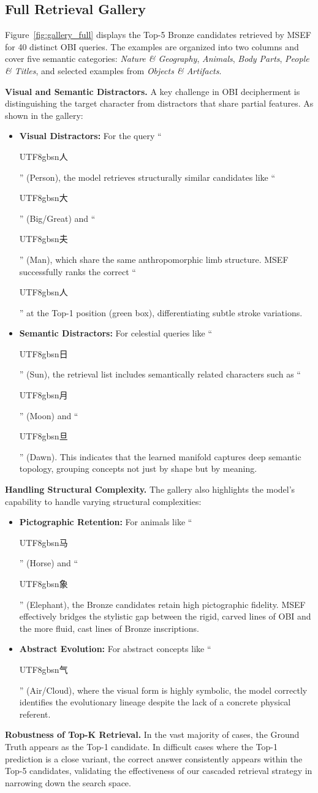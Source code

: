 \documentclass{article}
\newcommand{\cg}[1]{\begin{CJK*}{UTF8}{gbsn}#1\end{CJK*}}
\begin{document}
\subsection{Full Retrieval Gallery}
Figure~\ref{fig:gallery_full} displays the Top-5 Bronze candidates retrieved by MSEF for 40 distinct OBI queries. The examples are organized into two columns and cover five semantic categories: \textit{Nature \& Geography}, \textit{Animals}, \textit{Body Parts}, \textit{People \& Titles}, and selected examples from \textit{Objects \& Artifacts}.

\textbf{Visual and Semantic Distractors.}
A key challenge in OBI decipherment is distinguishing the target character from distractors that share partial features. As shown in the gallery:
\begin{itemize}
    \item \textbf{Visual Distractors:} For the query ``\cg{人}'' (Person), the model retrieves structurally similar candidates like ``\cg{大}'' (Big/Great) and ``\cg{夫}'' (Man), which share the same anthropomorphic limb structure. MSEF successfully ranks the correct ``\cg{人}'' at the Top-1 position (green box), differentiating subtle stroke variations.
    \item \textbf{Semantic Distractors:} For celestial queries like ``\cg{日}'' (Sun), the retrieval list includes semantically related characters such as ``\cg{月}'' (Moon) and ``\cg{旦}'' (Dawn). This indicates that the learned manifold captures deep semantic topology, grouping concepts not just by shape but by meaning.
\end{itemize}

\textbf{Handling Structural Complexity.}
The gallery also highlights the model's capability to handle varying structural complexities:
\begin{itemize}
    \item \textbf{Pictographic Retention:} For animals like ``\cg{马}'' (Horse) and ``\cg{象}'' (Elephant), the Bronze candidates retain high pictographic fidelity. MSEF effectively bridges the stylistic gap between the rigid, carved lines of OBI and the more fluid, cast lines of Bronze inscriptions.
    \item \textbf{Abstract Evolution:} For abstract concepts like ``\cg{气}'' (Air/Cloud), where the visual form is highly symbolic, the model correctly identifies the evolutionary lineage despite the lack of a concrete physical referent.
\end{itemize}

\textbf{Robustness of Top-K Retrieval.}
In the vast majority of cases, the Ground Truth appears as the Top-1 candidate. In difficult cases where the Top-1 prediction is a close variant, the correct answer consistently appears within the Top-5 candidates, validating the effectiveness of our cascaded retrieval strategy in narrowing down the search space.
\end{document}
